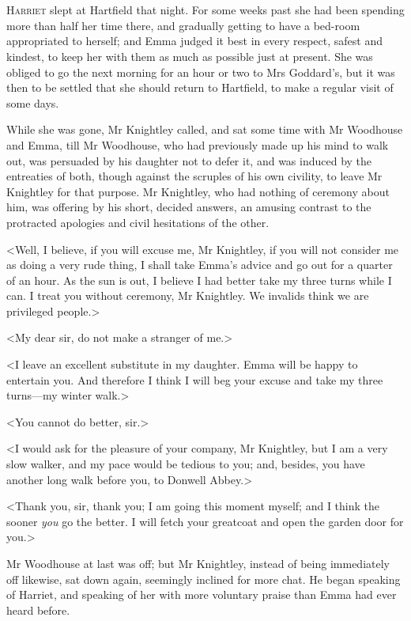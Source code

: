 \chapter[Chapter \thechapter]{}
\lettrine[lraise=0.3]{H}{arriet} slept at Hartfield that night. For some weeks past she had been spending more than half her time there, and gradually getting to have a bed-room appropriated to herself; and Emma judged it best in every respect, safest and kindest, to keep her with them as much as possible just at present. She was obliged to go the next morning for an hour or two to Mrs Goddard's, but it was then to be settled that she should return to Hartfield, to make a regular visit of some days.

While she was gone, Mr Knightley called, and sat some time with Mr Woodhouse and Emma, till Mr Woodhouse, who had previously made up his mind to walk out, was persuaded by his daughter not to defer it, and was induced by the entreaties of both, though against the scruples of his own civility, to leave Mr Knightley for that purpose. Mr Knightley, who had nothing of ceremony about him, was offering by his short, decided answers, an amusing contrast to the protracted apologies and civil hesitations of the other.

<Well, I believe, if you will excuse me, Mr Knightley, if you will not consider me as doing a very rude thing, I shall take Emma's advice and go out for a quarter of an hour. As the sun is out, I believe I had better take my three turns while I can. I treat you without ceremony, Mr Knightley. We invalids think we are privileged people.>

<My dear sir, do not make a stranger of me.>

<I leave an excellent substitute in my daughter. Emma will be happy to entertain you. And therefore I think I will beg your excuse and take my three turns—my winter walk.>

<You cannot do better, sir.>

<I would ask for the pleasure of your company, Mr Knightley, but I am a very slow walker, and my pace would be tedious to you; and, besides, you have another long walk before you, to Donwell Abbey.>

<Thank you, sir, thank you; I am going this moment myself; and I think the sooner \textit{you} go the better. I will fetch your greatcoat and open the garden door for you.>

Mr Woodhouse at last was off; but Mr Knightley, instead of being immediately off likewise, sat down again, seemingly inclined for more chat. He began speaking of Harriet, and speaking of her with more voluntary praise than Emma had ever heard before.

